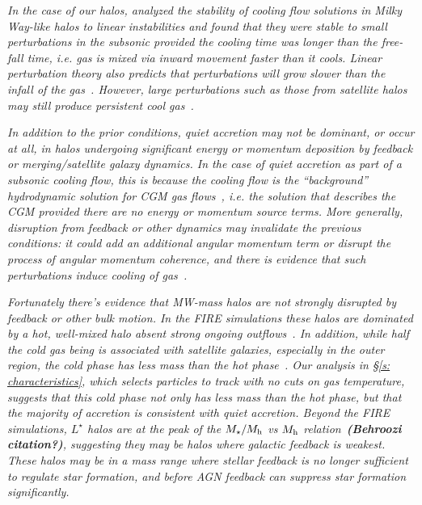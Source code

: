 \documentclass[fleqn,usenatbib]{mnras}
\begin{document}
\textit{
In the case of our halos, \cite{Stern2019} analyzed the stability of cooling flow solutions in Milky Way-like halos to linear instabilities and found that they were stable to small perturbations in the subsonic provided the cooling time was longer than the free-fall time, i.e. gas is mixed via inward movement faster than it cools.
Linear perturbation theory also predicts that perturbations will grow slower than the infall of the gas~\citep[e.g.][]{Balbus1989}.
However, large perturbations such as those from satellite halos may still produce persistent cool gas~\citep{Esmerian2020}.
}

\textit{
In addition to the prior conditions, quiet accretion may not be dominant, or occur at all, in halos undergoing significant energy or momentum deposition by feedback or merging/satellite galaxy dynamics.
In the case of quiet accretion as part of a subsonic cooling flow, this is because the cooling flow is the ``background'' hydrodynamic solution for CGM gas flows~\cite{Stern2019}, i.e. the solution that describes the CGM provided there are no energy or momentum source terms.
More generally, disruption from feedback or other dynamics may invalidate the previous conditions: it could add an additional angular momentum term or disrupt the process of angular momentum coherence, and there is evidence that such perturbations induce cooling of gas~\citep[e.g.][]{Hummels2019, Esmerian2020}.
}

\textit{
Fortunately there's evidence that MW-mass halos are not strongly disrupted by feedback or other bulk motion.
In the FIRE simulations these halos are dominated by a hot, well-mixed halo absent strong ongoing outflows~\citep{Hafen2019}.
In addition, while half the cold gas being is associated with satellite galaxies, especially in the outer region, the cold phase has less mass than the hot phase~\citep{Hafen2020}.
Our analysis in \S\ref{s: characteristics}, which selects particles to track with no cuts on gas temperature, suggests that this cold phase not only has less mass than the hot phase, but that the majority of accretion is consistent with quiet accretion.
Beyond the FIRE simulations, $L^\star$ halos are at the peak of the $M_\star/M_{\rm h}$ vs $M_{\rm h}$ relation~\textbf{(Behroozi citation?)}, suggesting they may be halos where galactic feedback is weakest.
These halos may be in a mass range where stellar feedback is no longer sufficient to regulate star formation, and before AGN feedback can suppress star formation significantly.
}
\end{document}
